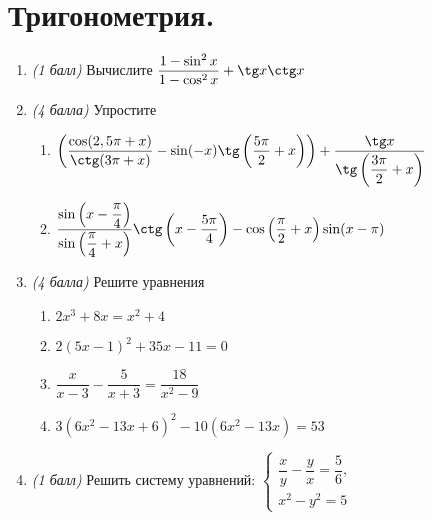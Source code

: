 \documentclass[12pt, a4paper]{article}
\begin{document}
	
	
	\section*{Тригонометрия.}
	\begin{enumerate}
		\item \textit{(1 балл)} Вычислите
		$\dfrac{1-\sin^2x}{1-\cos^2x}+\tg x \ctg x$
		\item \textit{(4 балла)} Упростите
		\begin{enumerate}[label=\asbuk*)]
			\item $\left( \dfrac{\cos (2,5 \pi + x)}{\ctg (3\pi + x)}-\sin(-x)\tg\left( \dfrac{5\pi}{2}+x\right) \right)+\dfrac{\tg x}{\tg \left( \dfrac{3\pi}{2}+x\right)}$
			\item $\dfrac{\sin \left( x-\dfrac{\pi}{4}\right)}{\sin\left( \dfrac{\pi}{4}+x\right) }\ctg \left( x-\dfrac{5\pi}{4}\right) - \cos \left( \dfrac{\pi}{2}+x\right)\sin(x-\pi) $
		\end{enumerate}
		\item \textit{(4 балла)} Решите уравнения
		\begin{enumerate}[label=\asbuk*)]
			\item $2x^3+8x=x^2+4$
			\item $2(5x-1)^2+35x-11=0$
			\item $\dfrac{x}{x-3}-\dfrac{5}{x+3}=\dfrac{18}{x^2-9}$
			\item $3(6x^2-13x+6)^2-10(6x^2-13x)=53$
		\end{enumerate}
		\item \textit{(1 балл)} Решить систему уравнений:
		$
		\left\{
		\begin{aligned}
			\dfrac{x}{y}-\dfrac{y}{x}=\dfrac{5}{6},\\
			x^2-y^2=5
		\end{aligned}
		\right.
		$
	\end{enumerate}
\end{document}
